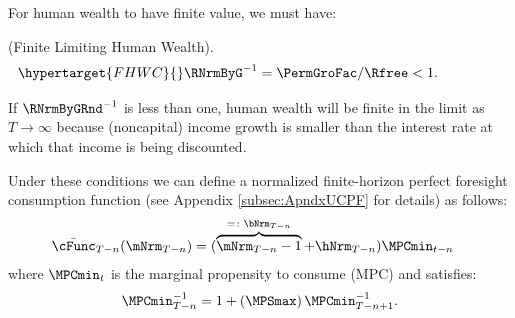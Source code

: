 \documentclass[BufferStockTheory]{subfiles}
\begin{document}
For human wealth to have finite value, we must have:
%
\begin{assumI}\label{ass:FHWC}(Finite Limiting Human Wealth).
\begin{equation}\begin{gathered}\begin{aligned}\hypertarget{FHWC}{}
   \RNrmByG^{-1} = \PermGroFac/\Rfree  & < 1. \phantom{\text{{\FHWC}:~~}}\label{eq:FHWC2}
\end{aligned}\end{gathered}\end{equation}
\end{assumI}
%
If $\RNrmByGRnd^{-1}$ is less than one, human wealth will be finite in the limit as $T \rightarrow \infty$ because (noncapital) income growth is smaller than the interest rate at which that income is being discounted.

Under these conditions we can define a normalized finite-horizon perfect foresight consumption function (see Appendix \ref{subsec:ApndxUCPF} for details) as follows:\hypertarget{MPCminDefn}{}
%
\begin{equation}\begin{gathered}\begin{aligned}
  \bar{\cFunc}_{T-n}(\mNrm_{T-n})  & = (\overbrace{\mNrm_{T-n}-1}^{
                                     = \colon  \bNrm_{T-n}}+\hNrm_{T-n})\MPCmin_{t-n}
\end{aligned}\end{gathered}\end{equation}
%
where $\MPCmin_{t}$ is the marginal propensity to consume (MPC) and satisfies:
%
\begin{equation}\begin{gathered}\begin{aligned}\label{eq:PFMPCminInv}
\MPCmin_{T-n}^{-1}  = 1+\left(\MPSmax\right) \MPCmin_{T-n+1}^{-1}.
\end{aligned}\end{gathered}\end{equation}
%
\end{document}
